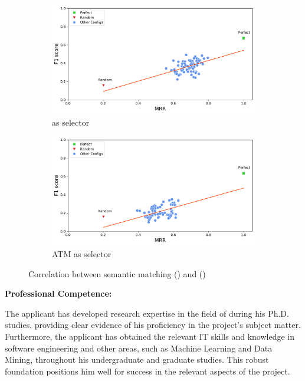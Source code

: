\begin{figure}[H]
	\centering
	\begin{subfigure}{.5\textwidth}
		\centering
		\includegraphics[width=1\linewidth]{images/MRR_craftdroid_all_oracle_included.pdf}
		\caption{\craftdroid as selector}
		\label{fig:MRR_craftdroid_all_oracle_full}
	\end{subfigure}%
	\begin{subfigure}{.5\textwidth}
		\centering
		\includegraphics[width=1\linewidth]{images/MRR_atm_atm_oracle_included_passfree.pdf}
		\caption{ ATM as selector}
		\label{fig:MRR_atm_atm_oracle_passfree_full.pdf}
	\end{subfigure}
	\caption{Correlation between semantic matching (\mrr) and \testreuse (\fscore)}
	\label{fig:MRR-F1-scatter}
\end{figure}


\noindent
\textbf{Professional Competence:}

\noindent
The applicant has developed research expertise in the field of \testreuse during his Ph.D. studies, providing clear evidence of his proficiency in the project's subject matter.
Furthermore, the applicant has obtained the relevant IT skills and knowledge in software engineering and other areas, such as Machine Learning and Data Mining, throughout his undergraduate and graduate studies. This robust foundation positions him well for success in the relevant aspects of the project.













